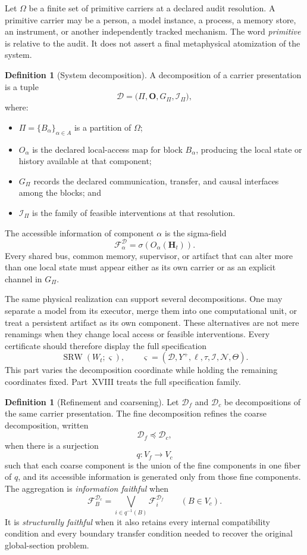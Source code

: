 \documentclass[11pt,letterpaper]{article}
\newcommand{\SRW}{\operatorname{SRW}}
\theoremstyle{plain}
\theoremstyle{definition}
\newtheorem{definition}[theorem]{Definition}
\begin{document}
Let \(\Omega\) be a finite set of primitive carriers at a declared audit
resolution. A primitive carrier may be a person, a model instance, a process,
a memory store, an instrument, or another independently tracked mechanism.
The word \emph{primitive} is relative to the audit. It does not assert a final
metaphysical atomization of the system.

\begin{definition}[System decomposition]\label{def:system-decomposition}
A decomposition of a carrier presentation is a tuple
\[
\mathcal D
=
\bigl(
\Pi,\mathbf O,G_{\Pi},\mathcal I_{\Pi}
\bigr),
\]
where:
\begin{itemize}
\item \(\Pi=\{B_\alpha\}_{\alpha\in A}\) is a partition of \(\Omega\);
\item \(O_\alpha\) is the declared local-access map for block \(B_\alpha\),
 producing the local state or history available at that component;
\item \(G_{\Pi}\) records the declared communication, transfer, and causal
 interfaces among the blocks; and
\item \(\mathcal I_{\Pi}\) is the family of feasible interventions at that
 resolution.
\end{itemize}
The accessible information of component \(\alpha\) is the sigma-field
\[
\mathscr F_\alpha^{\mathcal D}
=
\sigma\!\left(O_\alpha(\mathbf H_t)\right).
\]
Every shared bus, common memory, supervisor, or artifact that can alter more
than one local state must appear either as its own carrier or as an explicit
channel in \(G_{\Pi}\).
\end{definition}

The same physical realization can support several decompositions. One may
separate a model from its executor, merge them into one computational unit, or
treat a persistent artifact as its own component. These alternatives are not
mere renamings when they change local access or feasible interventions. Every certificate should therefore display the full specification
\[
\SRW(W_t;\varsigma),
\qquad
\varsigma=(\mathcal D,Y^+,\ell,\tau,\mathcal I,\mathcal N,\Theta).
\]
This part varies the decomposition coordinate while holding the remaining
coordinates fixed. Part~XVIII treats the full specification family.

\begin{definition}[Refinement and coarsening]\label{def:decomposition-refinement}
Let \(\mathcal D_f\) and \(\mathcal D_c\) be decompositions of the same carrier
presentation. The fine decomposition refines the coarse decomposition,
written
\[
\mathcal D_f\preceq\mathcal D_c,
\]
when there is a surjection
\[
q:V_f\longrightarrow V_c
\]
such that each coarse component is the union of the fine components in one
fiber of \(q\), and its accessible information is generated only from those
fine components. The aggregation is \emph{information faithful} when
\[
\mathscr F_B^{\mathcal D_c}
=
\bigvee_{i\in q^{-1}(B)}
\mathscr F_i^{\mathcal D_f}
\qquad(B\in V_c).
\]
It is \emph{structurally faithful} when it also retains every internal
compatibility condition and every boundary transfer condition needed to
recover the original global-section problem.
\end{definition}
\end{document}
